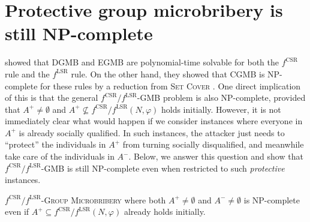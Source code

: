 \documentclass[
    12pt,               %
    a4paper,            %
    bibtotoc,           %
    pointlessnumbers,   %
    ngerman,            %
    titlepage,          %
    leqno,              %
    ]{scrarticle}       %
\begin{document}
\clearpage

\section{Protective group microbribery is still NP-complete}
\label{sec:protective_instances}

\textcite[Theorem 2]{BBKL20} showed that DGMB and EGMB are polynomial-time solvable for both the $f^{\text{CSR}}$ rule and the $f^{\text{LSR}}$ rule. On the other hand, they showed that CGMB is NP-complete for these rules by a reduction from \textsc{Set Cover} \cite[Theorem 3]{BBKL20}. One direct implication of this is that the general $f^{\text{CSR}} / f^{\text{LSR}}$-GMB problem is also NP-complete, provided that $A^+ \neq \emptyset$ and $A^+ \not\subseteq f^{\text{CSR}} / f^{\text{LSR}}(N, \varphi)$ holds initially. However, it is not immediately clear what would happen if we consider instances where everyone in $A^+$ is already socially qualified. In such instances, the attacker just needs to ``protect'' the individuals in $A^+$ from turning socially disqualified, and meanwhile take care of the individuals in $A^-$. Below, we answer this question and show that $f^{\text{CSR}} / f^{\text{LSR}}$-GMB is still NP-complete even when restricted to such \emph{protective} instances.

\begin{Theorem} \label{thm:gmb_protective_instances_npc}
$f^{\text{CSR}} / f^{\text{LSR}}$-\textsc{Group Microbribery} where both $A^+ \neq \emptyset$ and $A^- \neq \emptyset$ is NP-complete even if $A^+ \subseteq f^{\text{CSR}} / f^{\text{LSR}}(N, \varphi)$ already holds initially.
\end{Theorem}
\end{document}
